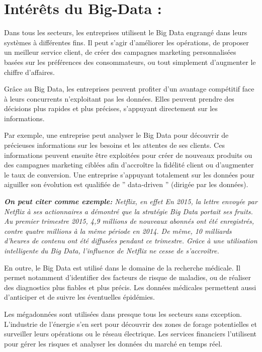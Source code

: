 \section{Intérêts du Big-Data :}
Dans tous les secteurs, les entreprises utilisent le Big Data engrangé dans leurs systèmes à différentes fins. Il peut s’agir d’améliorer les opérations, de proposer un meilleur service client, de créer des campagnes marketing personnalisées basées sur les préférences des consommateurs, ou tout simplement d’augmenter le chiffre d’affaires.

Grâce au Big Data, les entreprises peuvent profiter d’un avantage compétitif face à leurs concurrents n’exploitant pas les données. Elles peuvent prendre des décisions plus rapides et plus précises, s’appuyant directement sur les informations.

Par exemple, une entreprise peut analyser le Big Data pour découvrir de précieuses informations sur les besoins et les attentes de ses clients. Ces informations peuvent ensuite être exploitées pour créer de nouveaux produits ou des campagnes marketing ciblées afin d’accroître la fidélité client ou d’augmenter le taux de conversion. Une entreprise s’appuyant totalement sur les données pour aiguiller son évolution est qualifiée de ” data-driven ” (dirigée par les données).

\textit{\textbf{On peut citer comme exemple:} Netflix, en effet En 2015, la lettre envoyée par Netflix à ses actionnaires a démontré que la stratégie Big Data portait ses fruits. Au premier trimestre 2015, 4,9 millions de nouveaux abonnés ont été enregistrés, contre quatre millions à la même période en 2014. De même, 10 milliards d’heures de contenu ont été diffusées pendant ce trimestre. Grâce à une utilisation intelligente du Big Data, l’influence de Netflix ne cesse de s’accroître.}

En outre, le Big Data est utilisé dans le domaine de la recherche médicale. Il permet notamment d’identifier des facteurs de risque de maladies, ou de réaliser des diagnostics plus fiables et plus précis. Les données médicales permettent aussi d’anticiper et de suivre les éventuelles épidémies.

Les mégadonnées sont utilisées dans presque tous les secteurs sans exception. L’industrie de l’énergie s’en sert pour découvrir des zones de forage potentielles et surveiller leurs opérations ou le réseau électrique. Les services financiers l’utilisent pour gérer les risques et analyser les données du marché en temps réel.

